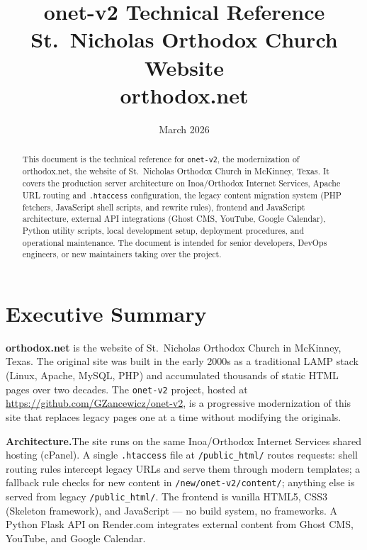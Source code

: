 \documentclass[12pt]{article}
\title{onet-v2 Technical Reference\\[0.5em]\large St.\ Nicholas Orthodox Church Website\\[0.3em]\small orthodox.net}
\author{}
\date{March 2026}
\begin{document}
\maketitle

\begin{abstract}
This document is the technical reference for \texttt{onet-v2}, the modernization of orthodox.net, the website of St.\ Nicholas Orthodox Church in McKinney, Texas. It covers the production server architecture on Inoa/Orthodox Internet Services, Apache URL routing and \texttt{.htaccess} configuration, the legacy content migration system (PHP fetchers, JavaScript shell scripts, and rewrite rules), frontend and JavaScript architecture, external API integrations (Ghost CMS, YouTube, Google Calendar), Python utility scripts, local development setup, deployment procedures, and operational maintenance. The document is intended for senior developers, DevOps engineers, or new maintainers taking over the project.
\end{abstract}

\tableofcontents
\newpage

\section*{Executive Summary}

\textbf{orthodox.net} is the website of St.\ Nicholas Orthodox Church in McKinney, Texas. The original site was built in the early 2000s as a traditional LAMP stack (Linux, Apache, MySQL, PHP) and accumulated thousands of static HTML pages over two decades. The \texttt{onet-v2} project, hosted at \url{https://github.com/GZancewicz/onet-v2}, is a progressive modernization of this site that replaces legacy pages one at a time without modifying the originals.

\medskip
\textbf{Architecture.}\quad The site runs on the same Inoa/Orthodox Internet Services shared hosting (cPanel). A single \texttt{.htaccess} file at \texttt{/public\_html/} routes requests: shell routing rules intercept legacy URLs and serve them through modern templates; a fallback rule checks for new content in \texttt{/new/onet-v2/content/}; anything else is served from legacy \texttt{/public\_html/}. The frontend is vanilla HTML5, CSS3 (Skeleton framework), and JavaScript --- no build system, no frameworks. A Python Flask API on Render.com integrates external content from Ghost CMS, YouTube, and Google Calendar.
\end{document}
